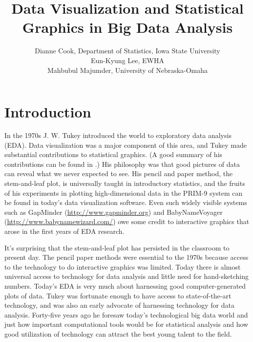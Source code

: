\documentclass{article}
\begin{document}
\title{Data Visualization and Statistical Graphics in Big Data Analysis}%
\author{Dianne Cook, Department of Statistics, Iowa State University\\
Eun-Kyung Lee, EWHA\\
Mahbubul Majumder, University of Nebraska-Omaha}
\maketitle

\section{Introduction}

In the 1970s J. W. Tukey introduced the world to exploratory data analysis (EDA). Data visualization was a major component of this area, and Tukey made substantial contributions to statistical graphics. (A good summary of his contributions can be found in \citet{stuetzlefriedman2002}.) His philosophy was that good pictures of data can reveal what we never expected to see. His pencil and paper method, the stem-and-leaf plot, is universally taught in introductory statistics, and the fruits of his experiments in plotting high-dimensional data in the PRIM-9 system can be found in today's data visualization software. Even such widely visible systems such as GapMinder (\url{http://www.gapminder.org}) and BabyNameVoyager (\url{http://www.babynamewizard.com/}) owe some credit to interactive graphics that arose in the first years of EDA research. 

It's surprising that the stem-and-leaf plot has persisted in the classroom to present day. The pencil paper methods were essential to the 1970s because access to the technology to do interactive graphics was limited. Today there is almost universal access to technology for data analysis and little need for hand-sketching numbers. Today's EDA is very much about harnessing good computer-generated plots of data. Tukey was fortunate enough to have access to state-of-the-art technology, and was also an early advocate of harnessing technology for data analysis. Forty-five years ago he foresaw today's technological big data world and just how important computational tools would be for statistical analysis and how good utilization of technology can attract the best young talent to the field. 
\end{document}
